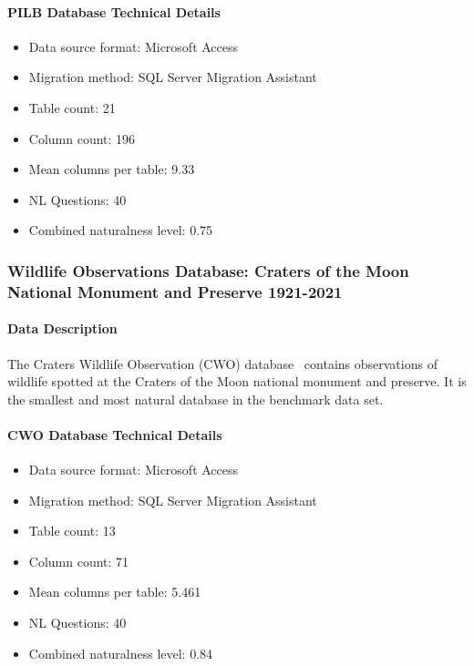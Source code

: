 \paragraph{PILB Database Technical Details}
\begin{itemize}
  \item Data source format: Microsoft Access
  \item Migration method: SQL Server Migration Assistant
  \item Table count: 21
  \item Column count: 196
  \item Mean columns per table: 9.33
  \item NL Questions: 40
  \item Combined naturalness level: 0.75 
\end{itemize}

\subsubsection{Wildlife Observations Database: Craters of the Moon National Monument and Preserve 1921-2021}

\paragraph{Data Description}
The Craters Wildlife Observation (CWO) database~\cite{craters-of-the-moon-wildlife} contains observations of wildlife spotted at the Craters of the Moon national monument and preserve.
It is the smallest and most natural database in the benchmark data set.


\paragraph{CWO Database Technical Details}
\begin{itemize}
  \item Data source format: Microsoft Access
  \item Migration method: SQL Server Migration Assistant
  \item Table count: 13
  \item Column count: 71
  \item Mean columns per table: 5.461
  \item NL Questions: 40
  \item Combined naturalness level: 0.84 
\end{itemize}

